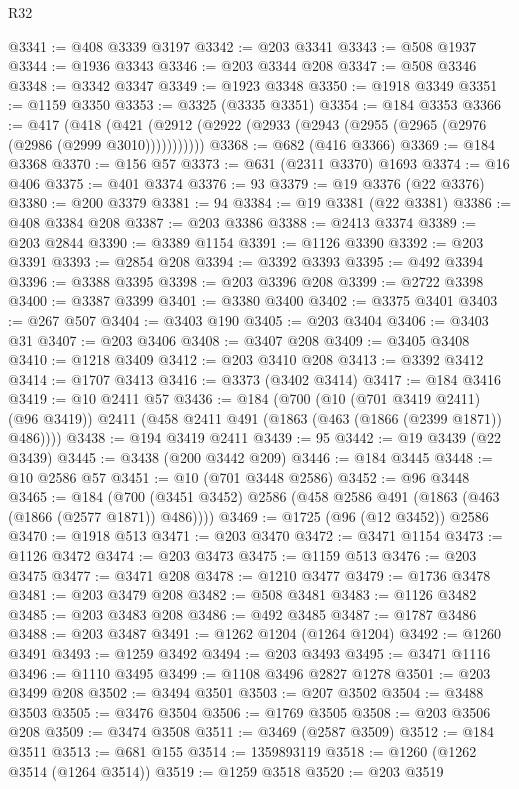 \begin{lexlean}{R32}
\begin{coremodule}
@3341 := @408 @3339 @3197
@3342 := @203 @3341
@3343 := @508 @1937
@3344 := @1936 @3343
@3346 := @203 @3344 @208
@3347 := @508 @3346
@3348 := @3342 @3347
@3349 := @1923 @3348
@3350 := @1918 @3349
@3351 := @1159 @3350
@3353 := @3325 (@3335 @3351)
@3354 := @184 @3353
@3366 := @417
    (@418 (@421 (@2912 (@2922 (@2933 (@2943 (@2955 (@2965 (@2976 (@2986 (@2999 @3010)))))))))))
@3368 := @682 (@416 @3366)
@3369 := @184 @3368
@3370 := @156 @57
@3373 := @631 (@2311 @3370) @1693
@3374 := @16 @406
@3375 := @401 @3374
@3376 := 93
@3379 := @19 @3376 (@22 @3376)
@3380 := @200 @3379
@3381 := 94
@3384 := @19 @3381 (@22 @3381)
@3386 := @408 @3384 @208
@3387 := @203 @3386
@3388 := @2413 @3374
@3389 := @203 @2844
@3390 := @3389 @1154
@3391 := @1126 @3390
@3392 := @203 @3391
@3393 := @2854 @208
@3394 := @3392 @3393
@3395 := @492 @3394
@3396 := @3388 @3395
@3398 := @203 @3396 @208
@3399 := @2722 @3398
@3400 := @3387 @3399
@3401 := @3380 @3400
@3402 := @3375 @3401
@3403 := @267 @507
@3404 := @3403 @190
@3405 := @203 @3404
@3406 := @3403 @31
@3407 := @203 @3406
@3408 := @3407 @208
@3409 := @3405 @3408
@3410 := @1218 @3409
@3412 := @203 @3410 @208
@3413 := @3392 @3412
@3414 := @1707 @3413
@3416 := @3373 (@3402 @3414)
@3417 := @184 @3416
@3419 := @10 @2411 @57
@3436 := @184
    (@700
      (@10 (@701 @3419 @2411) (@96 @3419))
      @2411
      (@458 @2411 @491 (@1863 (@463 (@1866 (@2399 @1871)) @486))))
@3438 := @194 @3419 @2411
@3439 := 95
@3442 := @19 @3439 (@22 @3439)
@3445 := @3438 (@200 @3442 @209)
@3446 := @184 @3445
@3448 := @10 @2586 @57
@3451 := @10 (@701 @3448 @2586)
@3452 := @96 @3448
@3465 := @184 (@700 (@3451 @3452) @2586 (@458 @2586 @491 (@1863 (@463 (@1866 (@2577 @1871)) @486))))
@3469 := @1725 (@96 (@12 @3452)) @2586
@3470 := @1918 @513
@3471 := @203 @3470
@3472 := @3471 @1154
@3473 := @1126 @3472
@3474 := @203 @3473
@3475 := @1159 @513
@3476 := @203 @3475
@3477 := @3471 @208
@3478 := @1210 @3477
@3479 := @1736 @3478
@3481 := @203 @3479 @208
@3482 := @508 @3481
@3483 := @1126 @3482
@3485 := @203 @3483 @208
@3486 := @492 @3485
@3487 := @1787 @3486
@3488 := @203 @3487
@3491 := @1262 @1204 (@1264 @1204)
@3492 := @1260 @3491
@3493 := @1259 @3492
@3494 := @203 @3493
@3495 := @3471 @1116
@3496 := @1110 @3495
@3499 := @1108 @3496 @2827 @1278
@3501 := @203 @3499 @208
@3502 := @3494 @3501
@3503 := @207 @3502
@3504 := @3488 @3503
@3505 := @3476 @3504
@3506 := @1769 @3505
@3508 := @203 @3506 @208
@3509 := @3474 @3508
@3511 := @3469 (@2587 @3509)
@3512 := @184 @3511
@3513 := @681 @155
@3514 := 1359893119
@3518 := @1260 (@1262 @3514 (@1264 @3514))
@3519 := @1259 @3518
@3520 := @203 @3519

\end{coremodule}
\end{lexlean}
